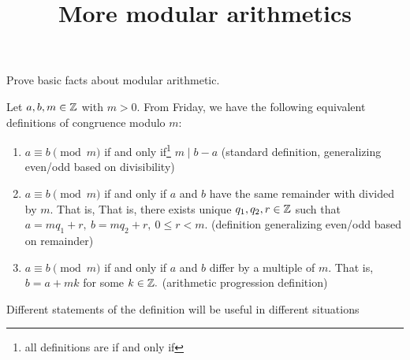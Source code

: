 \documentclass{ximera}
\title{More modular arithmetics}
\begin{document}
\begin{abstract}
\end{abstract}
\maketitle


\begin{obj}
\item Prove basic facts about modular arithmetic.
\end{obj}

\begin{defn}\label{defn:mod-equiv-all}
Let $a,b,m\in\mathbb Z$ with $m>0.$ From Friday, we have the following equivalent definitions of congruence modulo $m:$
\begin{enumerate}
 \item $a\equiv b \pmod m$ if and only if\footnote{all definitions are if and only if} $m\mid b-a$ (standard definition, generalizing even/odd based on divisibility)
 \item $a\equiv b \pmod m$ if and only if $a$ and $b$ have the same remainder with divided by $m.$ That is, That is, there exists unique $q_1,q_2,r\in\mathbb Z$ such that  $a=mq_1+r,\   b=mq_2+r,\  0\leq r<m.$ (definition generalizing even/odd based on remainder)
\item $a\equiv b\pmod m$ if and only if $a$ and $b$ differ by a multiple of $m.$ That is, $b=a+mk$ for some $k\in\mathbb Z.$ (arithmetic progression definition)
\end{enumerate}
\end{defn}

Different statements of the definition will be useful in different situations
\end{document}
